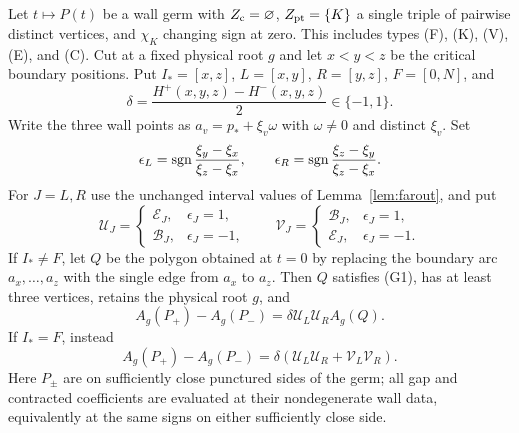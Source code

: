 \begin{theorem}\label{thm:single-triple}
Let $t\mapsto P(t)$ be a wall germ with $Z_{\rm c}=\varnothing$,
$Z_{\rm pt}=\{K\}$ a single triple of pairwise distinct vertices,
and $\chi_K$ changing sign at zero. This includes types (F), (K),
(V), (E), and (C). Cut at a fixed physical root $g$ and let
$x<y<z$ be the critical boundary positions. Put
$I_*=[x,z]$, $L=[x,y]$, $R=[y,z]$, $F=[0,N]$, and
\begin{equation}\label{afr:wall-data}
\delta=\frac{H^+(x,y,z)-H^-(x,y,z)}2\in\{-1,1\}.
\end{equation}
Write the three wall points as $a_v=p_*+\xi_v\omega$ with
$\omega\ne0$ and distinct $\xi_v$. Set
\begin{equation}\label{afr:wall-epsilons}
\epsilon_L=\operatorname{sgn}\frac{\xi_y-\xi_x}{\xi_z-\xi_x},\qquad
\epsilon_R=\operatorname{sgn}\frac{\xi_z-\xi_y}{\xi_z-\xi_x}.
\end{equation}
For $J=L,R$ use the unchanged interval values of
Lemma~\ref{lem:farout}, and put
\begin{equation}\label{afr:wall-uv}
\mathcal U_J=\begin{cases}\mathcal E_J,&\epsilon_J=1,\\
\mathcal B_J,&\epsilon_J=-1,\end{cases}\qquad
\mathcal V_J=\begin{cases}\mathcal B_J,&\epsilon_J=1,\\
\mathcal E_J,&\epsilon_J=-1.\end{cases}
\end{equation}
If $I_*\ne F$, let $Q$ be the polygon obtained at $t=0$ by
replacing the boundary arc $a_x,\ldots,a_z$ with the single edge
from $a_x$ to $a_z$. Then $Q$ satisfies (G1), has at least three
vertices, retains the physical root $g$, and
\begin{equation}\label{afr:wall-proper}
A_g(P_+)-A_g(P_-)=\delta\mathcal U_L\mathcal U_R A_g(Q).
\end{equation}
If $I_*=F$, instead
\begin{equation}\label{afr:wall-full}
A_g(P_+)-A_g(P_-)
=\delta(\mathcal U_L\mathcal U_R+\mathcal V_L\mathcal V_R).
\end{equation}
Here $P_\pm$ are on sufficiently close punctured sides of the germ;
all gap and contracted coefficients are evaluated at their nondegenerate
wall data, equivalently at the same signs on either sufficiently close side.
\end{theorem}

